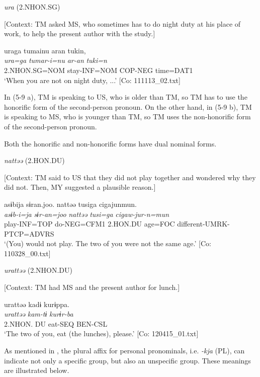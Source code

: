  \ex \label{ex:5:b} \textit{ura} (2.NHON.SG)

    [Context: TM asked MS, who sometimes has to do night duty at his place of work, to help the present author with the study.]

\glll  uraga  tumainu  aran  tukin,\\
\textit{ura=ga}  \textit{tumar-i=nu}  \textit{ar-an}  \textit{tuki=n}\\
2.NHON.SG=NOM  stay-INF=NOM  COP-NEG  time=DAT1\\
\glt ‘When you are not on night duty, ...’ [Co: 111113\_02.txt]
\z
\z

In (5-9 a), TM is speaking to US, who is older than TM, so TM has to use the honorific form of the second-person pronoun. On the other hand, in (5-9 b), TM is speaking to MS, who is younger than TM, so TM uses the non-honorific form of the second-person pronoun.

  Both the honorific and non-honorific forms have dual nominal forms.

\ea \label{ex:5:10}  \ea \label{ex:5:10a} \textit{nattəə} (2.HON.DU)

    [Context: TM said to US that they did not play together and wondered why they did not. Then, MY suggested a plausible reason.]

\glll  asɨbija  sɨran.joo.  nattəə  tusiga   cigajunmun.\\
\textit{asɨb-i=ja}  \textit{sɨr-an=joo}  \textit{nattəə}  \textit{tusi=ga}  \textit{cigaw-jur-n=mun}\\
play-INF=TOP  do-NEG=CFM1  2.HON.DU  age=FOC  different-UMRK-PTCP=ADVRS\\
\glt ‘(You) would not play. The two of you were not the same age.’ [Co: 110328\_00.txt]

 \ex \label{ex:5:b} \textit{urattəə} (2.NHON.DU)

    [Context: TM had MS and the present author for lunch.]

\glll  urattəə  kadɨ  kurɨppa.\\
\textit{urattəə}  \textit{kam-tɨ}  \textit{kurɨr-ba}\\
2.NHON. DU  eat-SEQ  BEN-CSL\\
\glt ‘The two of you, eat (the lunches), please.’ [Co: 120415\_01.txt]
\z
\z

  As mentioned in , the plural affix for personal pronominals, i.e. \textit{{}-kja} (PL), can indicate not only a specific group, but also an unspecific group. These meanings are illustrated below.

